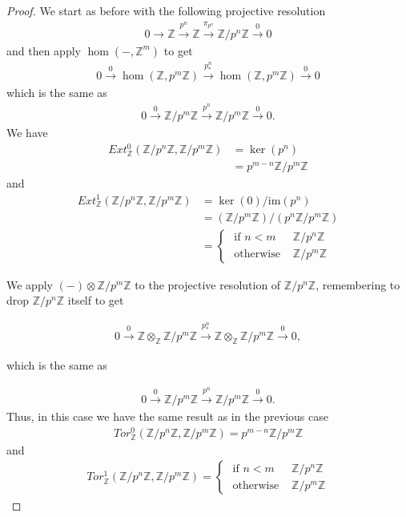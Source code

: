 \documentclass[12pt]{extarticle}
\newcommand{\im}{\text{im}}
\newcommand{\Z}{\mathbb{Z}}
\newcommand{\<}{\langle}
\renewcommand{\>}{\rangle}
\theoremstyle{definition}
\begin{document}
\begin{proof}
  We start as before with the following projective resolution
  \begin{align*}
    0 \to \Z \xrightarrow{p^n} \Z \xrightarrow{\pi_{p^n}} \Z/p^n\Z \xrightarrow{0} 0 
  \end{align*}
  and then apply $\hom(-, \Z^m)$ to get
  \begin{align*}
    0 \xrightarrow{0} \hom(\Z, p^m\Z) \xrightarrow{p^n_*} \hom(\Z, p^m\Z) \xrightarrow{0} 0
  \end{align*}
  which is the same as
  \begin{align*}
    0 \xrightarrow{0} \Z/p^m\Z \xrightarrow{p^n} \Z/p^m \Z \xrightarrow{0} 0.
  \end{align*}
  We have
  \begin{align*}
    Ext_{\Z}^0(\Z/p^n\Z, \Z/p^m\Z)
    &= \ker(p^n) \\
    &= p^{m-n}\Z/p^m\Z 
  \end{align*}
  and
  \begin{align*}
    Ext_{\Z}^1(\Z/p^n\Z, \Z/p^m\Z) &= \ker(0)/\im(p^n) \\
    &= (\Z/p^m \Z)/(p^n \Z / p^m \Z) \\
    &=
    \begin{cases}
      \text{ if } n<m & \Z/ p^n \Z \\
      \text{ otherwise } & \Z / p^m \Z
    \end{cases}
  \end{align*}

  We apply $(-) \otimes \Z/p^m\Z$ to the projective resolution of $\Z/p^n\Z$, remembering to drop $\Z/p^n \Z$ itself to get

  \begin{align*}
    0 \xrightarrow{0} \Z \otimes_{\Z} \Z/p^m\Z \xrightarrow{p^n_*} \Z \otimes_{\Z} \Z/p^m\Z \xrightarrow{0} 0 ,
  \end{align*}

  which is the same as

  \begin{align*}
    0 \xrightarrow{0} \Z/p^m\Z \xrightarrow{p^n} \Z/p^m\Z \xrightarrow{0} 0 .
  \end{align*}
  Thus, in this case we have the same result as in the previous case
  \begin{align*}
    Tor_{\Z}^0(\Z/p^n\Z, \Z/p^m\Z) = p^{m-n}\Z/p^m\Z
  \end{align*}
  and
  \begin{align*}
    Tor_{\Z}^1(\Z/p^n\Z, \Z/p^m\Z) =
    \begin{cases}
      \text{ if } n<m & \Z/ p^n \Z \\
      \text{ otherwise } & \Z / p^m \Z
    \end{cases}
  \end{align*}
  

\end{proof}
\end{document}

